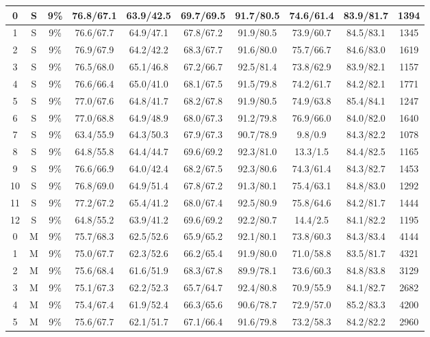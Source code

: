 \begin{table*}
{\begin{tabular}{|c|c|c||c|c|c|c|c|c||c|}
0 & S & 9\% & 76.8/67.1 & 63.9/42.5 & 69.7/69.5 & 91.7/80.5 & 74.6/61.4 & 83.9/81.7 & 1394 \\ \hline
1 & S & 9\% & 76.6/67.7 & 64.9/47.1 & 67.8/67.2 & 91.9/80.5 & 73.9/60.7 & 84.5/83.1 & 1345 \\ \hline
2 & S & 9\% & 76.9/67.9 & 64.2/42.2 & 68.3/67.7 & 91.6/80.0 & 75.7/66.7 & 84.6/83.0 & 1619 \\ \hline
3 & S & 9\% & 76.5/68.0 & 65.1/46.8 & 67.2/66.7 & 92.5/81.4 & 73.8/62.9 & 83.9/82.1 & 1157 \\ \hline
4 & S & 9\% & 76.6/66.4 & 65.0/41.0 & 68.1/67.5 & 91.5/79.8 & 74.2/61.7 & 84.2/82.1 & 1771 \\ \hline
5 & S & 9\% & 77.0/67.6 & 64.8/41.7 & 68.2/67.8 & 91.9/80.5 & 74.9/63.8 & 85.4/84.1 & 1247 \\ \hline
6 & S & 9\% & 77.0/68.8 & 64.9/48.9 & 68.0/67.3 & 91.2/79.8 & 76.9/66.0 & 84.0/82.0 & 1640 \\ \hline
7 & S & 9\% & 63.4/55.9 & 64.3/50.3 & 67.9/67.3 & 90.7/78.9 & 9.8/0.9 & 84.3/82.2 & 1078 \\ \hline
8 & S & 9\% & 64.8/55.8 & 64.4/44.7 & 69.6/69.2 & 92.3/81.0 & 13.3/1.5 & 84.4/82.5 & 1165 \\ \hline
9 & S & 9\% & 76.6/66.9 & 64.0/42.4 & 68.2/67.5 & 92.3/80.6 & 74.3/61.4 & 84.3/82.7 & 1453 \\ \hline
10 & S & 9\% & 76.8/69.0 & 64.9/51.4 & 67.8/67.2 & 91.3/80.1 & 75.4/63.1 & 84.8/83.0 & 1292 \\ \hline
11 & S & 9\% & 77.2/67.2 & 65.4/41.2 & 68.0/67.4 & 92.5/80.9 & 75.8/64.6 & 84.2/81.7 & 1444 \\ \hline
12 & S & 9\% & 64.8/55.2 & 63.9/41.2 & 69.6/69.2 & 92.2/80.7 & 14.4/2.5 & 84.1/82.2 & 1195 \\ \hline
0 & M & 9\% & 75.7/68.3 & 62.5/52.6 & 65.9/65.2 & 92.1/80.1 & 73.8/60.3 & 84.3/83.4 & 4144 \\ \hline
1 & M & 9\% & 75.0/67.7 & 62.3/52.6 & 66.2/65.4 & 91.9/80.0 & 71.0/58.8 & 83.5/81.7 & 4321 \\ \hline
2 & M & 9\% & 75.6/68.4 & 61.6/51.9 & 68.3/67.8 & 89.9/78.1 & 73.6/60.3 & 84.8/83.8 & 3129 \\ \hline
3 & M & 9\% & 75.1/67.3 & 62.2/52.3 & 65.7/64.7 & 92.4/80.8 & 70.9/55.9 & 84.1/82.7 & 2682 \\ \hline
4 & M & 9\% & 75.4/67.4 & 61.9/52.4 & 66.3/65.6 & 90.6/78.7 & 72.9/57.0 & 85.2/83.3 & 4200 \\ \hline
5 & M & 9\% & 75.6/67.7 & 62.1/51.7 & 67.1/66.4 & 91.6/79.8 & 73.2/58.3 & 84.2/82.2 & 2960 \\ \hline

\end{tabular}}
\end{table*}

